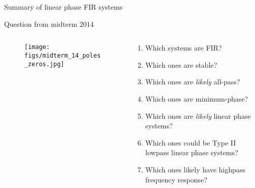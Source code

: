 \documentclass[10pt, aspectratio=169]{beamer}
\begin{document}
\begin{frame}{Summary of linear phase FIR systems}

\begin{center}
\end{center}

\end{frame}

\begin{frame}{Question from midterm 2014}
\vspace{-0.5cm}
\begin{columns}
	\begin{column}{0.66\textwidth}
		\begin{figure}
			\texttt{[image: figs/midterm\_14\_poles\_zeros.jpg]}
		\end{figure}
	\end{column}
	\begin{column}{0.4\textwidth}
		\begin{enumerate}
			\item Which systems are FIR?
			\item Which ones are stable?
			\item Which ones are \textit{likely} all-pass?
			\item Which ones are minimum-phase?
			\item Which ones are \textit{likely} linear phase systems?
			\item Which ones could be Type II lowpass linear phase systems?
			\item Which ones likely have highpass frequency response?
		\end{enumerate}
	\end{column}
\end{columns}
\end{frame}
\end{document}
